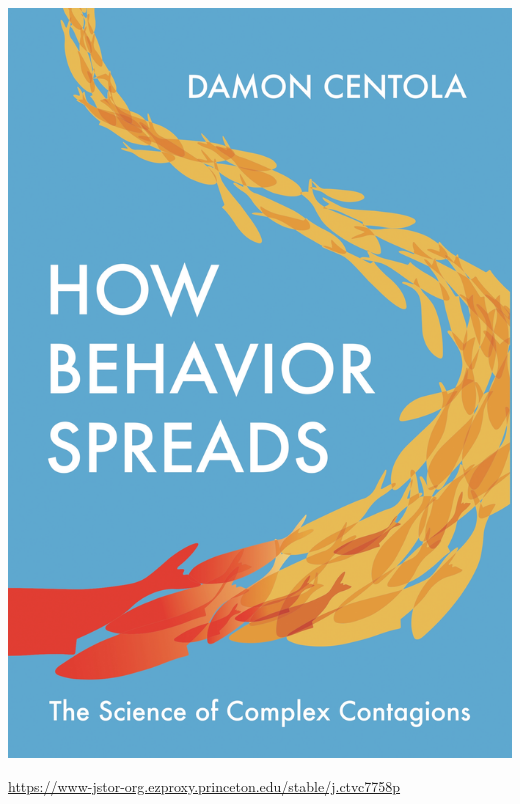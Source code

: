 \documentclass[aspectratio=169]{beamer}
\begin{document}
\begin{frame}

\begin{center}
\includegraphics[height=0.8\textheight]{figures/centola_how_2018_cover}
\end{center}

\vfill
\url{https://www-jstor-org.ezproxy.princeton.edu/stable/j.ctvc7758p}

\end{frame}
\end{document}

